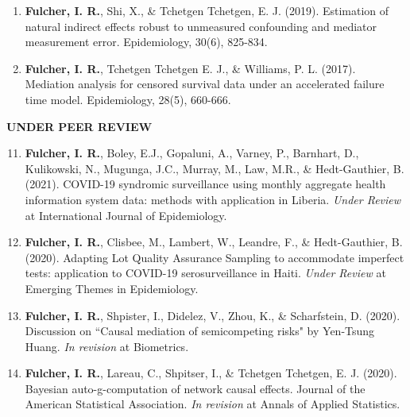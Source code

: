 \documentclass[12pt]{article}
\begin{document}
\begin{enumerate}
	\item \textbf{Fulcher, I. R.}, Shi, X., \& Tchetgen Tchetgen, E. J. (2019). Estimation of natural indirect effects robust to unmeasured confounding and mediator measurement error. Epidemiology, 30(6), 825-834.
	
	\item \textbf{Fulcher, I. R.}, Tchetgen Tchetgen E. J., \& Williams, P. L. (2017). Mediation analysis for censored survival data under an accelerated failure time model.  Epidemiology, 28(5), 660-666. 
		
\end{enumerate}

\noindent \textbf{UNDER PEER REVIEW}

\begin{enumerate}
	\setcounter{enumi}{10}
	
\item \textbf{Fulcher, I. R.}, Boley, E.J., Gopaluni, A., Varney, P., Barnhart, D., Kulikowski, N., Mugunga, J.C., Murray, M., Law, M.R., \& Hedt-Gauthier, B. (2021).  COVID-19 syndromic surveillance using monthly aggregate health information system data: methods with application in Liberia. \textit{Under Review} at International Journal of Epidemiology. 
	
\item \textbf{Fulcher, I. R.}, Clisbee, M., Lambert, W., Leandre, F., \& Hedt-Gauthier, B. (2020).  Adapting Lot Quality Assurance Sampling to accommodate imperfect tests: application to COVID-19 serosurveillance in Haiti. \textit{Under Review} at Emerging Themes in Epidemiology. 
	
\item \textbf{Fulcher, I. R.},  Shpister, I., Didelez, V., Zhou, K., \& Scharfstein, D. (2020). Discussion on ``Causal mediation of semicompeting risks" by Yen-Tsung Huang. \textit{In revision} at Biometrics. 

\item  \textbf{Fulcher, I. R.}, Lareau, C., Shpitser, I., \& Tchetgen Tchetgen, E. J. (2020). Bayesian auto-g-computation of network causal effects. Journal of the American Statistical Association. \textit{In revision} at Annals of Applied Statistics. 

\end{enumerate}



\end{document}
